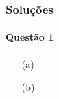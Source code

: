 \documentclass{report}
\begin{document}
\section{\color{red} Solu\c c\~oes}

\subsection{\color{red} Quest\~ao 1}

\begin{enumerate}

\item[(a)]

\item[(b)]

\end{enumerate}

\part{}
\end{document}
